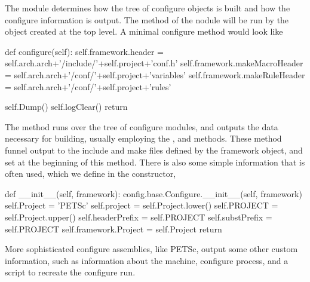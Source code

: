 {{{The  module determines how the tree of configure objects is built and how the configure information is output. The  method of the nodule will be run by the  object created at the top level. A minimal configure method would look like
\begin{pythonlisting}
def configure(self):
  self.framework.header          = self.arch.arch+'/include/'+self.project+'conf.h'
  self.framework.makeMacroHeader = self.arch.arch+'/conf/'+self.project+'variables'
  self.framework.makeRuleHeader  = self.arch.arch+'/conf/'+self.project+'rules'

  self.Dump()
  self.logClear()
  return
\end{pythonlisting}
The  method runs over the tree of configure modules, and outputs the data necessary for building, usually employing the ,  and  methods. These method funnel output to the include and make files defined by the framework object, and set at the beginning of this  method. There is also some simple information that is often used, which we define in the constructor,
\begin{pythonlisting}
def __init__(self, framework):
  config.base.Configure.__init__(self, framework)
  self.Project      = 'PETSc'
  self.project      = self.Project.lower()
  self.PROJECT      = self.Project.upper()
  self.headerPrefix = self.PROJECT
  self.substPrefix  = self.PROJECT
  self.framework.Project = self.Project
  return
\end{pythonlisting}
More sophisticated configure assemblies, like PETSc, output some other custom information, such as information about the machine, configure process, and a script to recreate the configure run.

}}}
